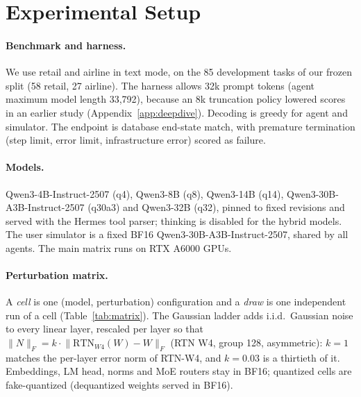 \section{Experimental Setup}
\label{sec:setup}

\paragraph{Benchmark and harness.} We use \tautwo{} \citep{barres2025tau2} retail and airline in text mode, on the 85 development tasks of our frozen split (58 retail, 27 airline). The harness allows 32k prompt tokens (agent maximum model length 33,792), because an 8k truncation policy lowered scores in an earlier study (Appendix~\ref{app:deepdive}). Decoding is greedy for agent and simulator. The endpoint is database end-state match, with premature termination (step limit, error limit, infrastructure error) scored as failure.

\paragraph{Models.} Qwen3-4B-Instruct-2507 (q4), Qwen3-8B (q8), Qwen3-14B (q14), Qwen3-30B-A3B-Instruct-2507 (q30a3) and Qwen3-32B (q32), pinned to fixed revisions and served with the Hermes tool parser; thinking is disabled for the hybrid models. The user simulator is a fixed BF16 Qwen3-30B-A3B-Instruct-2507, shared by all agents. The main matrix runs on RTX A6000 GPUs.

\paragraph{Perturbation matrix.} A \emph{cell} is one (model, perturbation) configuration and a \emph{draw} is one independent run of a cell (Table~\ref{tab:matrix}). The Gaussian ladder adds i.i.d.\ Gaussian noise to every linear layer, rescaled per layer so that $\lVert N \rVert_F = k \cdot \lVert \mathrm{RTN}_{W4}(W) - W \rVert_F$ (RTN W4, group 128, asymmetric): $k = 1$ matches the per-layer error norm of RTN-W4, and $k = 0.03$ is a thirtieth of it. Embeddings, LM head, norms and MoE routers stay in BF16; quantized cells are fake-quantized (dequantized weights served in BF16).

